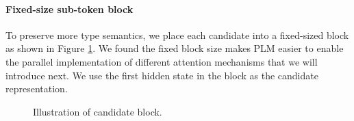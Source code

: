 \paragraph{Fixed-size sub-token block} To preserve more type semantics, we place each candidate into a fixed-sized block as shown in Figure \ref{fig:cand_block}. We found the fixed block size makes PLM easier to enable the parallel implementation of different attention mechanisms that we will introduce next. We use the first hidden state in the block as the candidate representation.
\begin{figure}[h]
    \centering
    \caption{Illustration of candidate block.}
    \label{fig:cand_block}
\end{figure}

